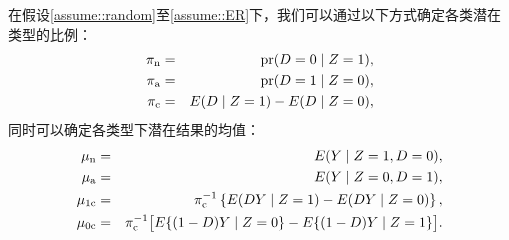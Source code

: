 \begin{theorem}
\label{thm::cace-mixture-components}
在假设\ref{assume::random}至\ref{assume::ER}下，我们可以通过以下方式确定各类潜在类型的比例：
\begin{eqnarray*}
 \pi_{\textup{n}} &=& \textup{pr}(D=0\mid Z=1)  ,\\
  \pi_{\textup{a}} &=&\textup{pr}(D=1\mid Z=0) , \\
  \pi_{\textup{c}} &=& E(D\mid Z=1) - E(D\mid Z=0) ,
\end{eqnarray*}
同时可以确定各类型下潜在结果的均值：
\begin{eqnarray*}
  \mu_{\textup{n}} &=& E(Y\mid Z=1, D=0) ,\\
 \mu_{\textup{a}} &=& E(Y\mid Z=0, D=1),\\
 \mu_{1\textup{c}} &=& \pi_{\textup{c}}^{-1}\left\{   E(DY\mid Z=1 )  -  E(DY\mid Z=0)    \right\}, \\
  \mu_{0\textup{c}}  &=& \pi_{\textup{c}}^{-1} \big[   E\{ (1-D)Y\mid Z=0 \}  -  E\{(1-D)Y\mid Z=1 \}    \big]. 
\end{eqnarray*}
\end{theorem}
 
